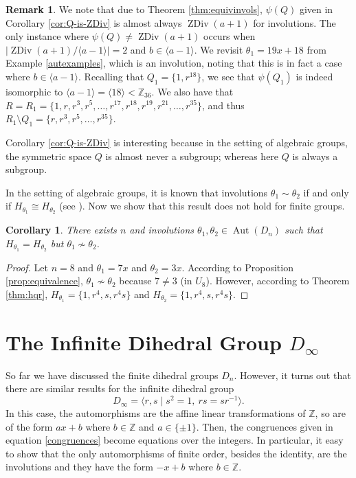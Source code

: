 \documentclass[12pt]{amsart}
\numberwithin{equation}{section}
\newtheorem{cor}[theorem]{Corollary}
\theoremstyle{definition}
\newtheorem{remark}[theorem]{Remark}
\newcommand{\Aut}{\operatorname{Aut}}
\newcommand{\Z}{\mathbb{Z}}
\newcommand{\zdiv}[1]{{\operatorname{ZDiv}(#1)}}
\renewcommand{\Z}{\mathbb{Z}}
\begin{document}
\begin{remark}
We note that due to Theorem \ref{thm:equivinvols}, $\psi(Q)$ given in Corollary \ref{cor:Q-is-ZDiv} is almost always $\zdiv{a+1}$ for involutions. The only instance where $\psi(Q)\ne \zdiv{a+1}$ occurs when $|\zdiv{a+1}/\langle a-1 \rangle|=2$ and $b\in\langle a-1\rangle$.  We revisit $\theta_1=19x+18$ from Example \ref{autexamples}, which is an involution, noting that this is in fact a case where $b\in\langle a-1\rangle$.  Recalling that $Q_1=\{1,r^{18}\}$, we see that $\psi (Q_1)$ is indeed isomorphic to $\langle a-1\rangle=\langle 18\rangle < \mathbb Z_{36}$.  We also have that $R=R_1=\{1,r,r^3,r^5,\dots,r^{17},r^{18},r^{19},r^{21},\dots, r^{35}\}$, and thus $R_1\setminus Q_1=\{r,r^3,r^5,\dots,r^{35}\}$.
\end{remark}

Corollary \ref{cor:Q-is-ZDiv} is interesting because in the setting of
algebraic groups, the symmetric space $Q$ is almost never a subgroup; whereas here $Q$ is always a subgroup.

In the setting of algebraic groups, it is known that involutions 
$\theta_1 \sim \theta_2$ if and only if $H_{\theta_1}\cong
H_{\theta_2}$ (see \cite{Helm-Wang93}). 
Now we show that this result does not hold for finite groups.

\begin{cor}
  There exists $n$ and involutions $\theta_1,\theta_2\in\Aut(D_n)$
  such that $H_{\theta_1} = H_{\theta_2}$ but
  $\theta_1 \not\sim \theta_2$.
\end{cor}

\begin{proof}
  Let $n=8$ and $\theta_1=7x$ and $\theta_2=3x$. According to
  Proposition \ref{prop:equivalence}, $\theta_1\not\sim\theta_2$ because
  $7 \ne 3$ (in $U_8$). However, according to Theorem \ref{thm:hqr},
  $H_{\theta_1}=\{1, r^4, s, r^4s\}$ and $H_{\theta_2}=\{1, r^4, s,
  r^4s\}$.
\end{proof}

\section{The Infinite Dihedral Group $D_\infty$}

So far we have discussed the finite dihedral groups $D_n$. However, it turns out that there are similar 
results for the infinite dihedral group
\[ D_\infty=\langle r,s\mid s^2=1,\ rs=sr^{-1}\rangle. \] In this
case, the automorphisms are the affine linear transformations of $\Z$,
so are of the form $ax+b$ where $b\in\Z$ and $a\in\{\pm 1\}$. Then,
the congruences given in equation \eqref{congruences} become equations over the integers. In particular, it easy to show that
the only automorphisms of finite order, besides the identity, are the
involutions and they have the form $-x+b$ where $b\in\Z$.
\end{document}
